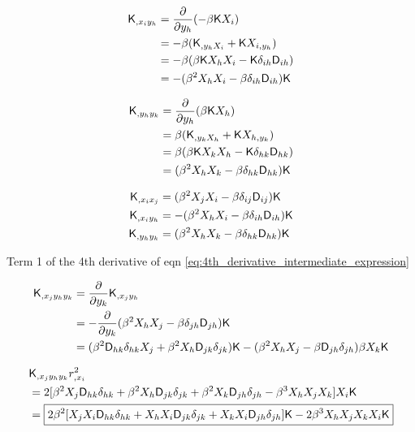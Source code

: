 \begin{align*}
\mathsf{K}_{,x_i y_h} &= \frac{\partial}{\partial y_h} (-\beta \mathsf{K} X_i)\\
&= -\beta(\mathsf{K}_{,y_h X_i} + \mathsf{K} X_{i, y_h})\\ 
&= -\beta(\beta \mathsf{K} X_h X_i - \mathsf{K} \delta_{ih} \mathsf{D}_{ih}) \\ 
&= -(\beta^2 X_h X_i - \beta \delta_{ih} \mathsf{D}_{ih})\mathsf{K} 
\end{align*}

\begin{align*}
\mathsf{K}_{,y_h y_k} &= \frac{\partial}{\partial y_h} (\beta \mathsf{K} X_h)\\
&= \beta(\mathsf{K}_{,y_k X_h} + \mathsf{K} X_{h, y_k})\\ 
&= \beta(\beta \mathsf{K} X_k X_h - \mathsf{K} \delta_{hk} \mathsf{D}_{hk}) \\ 
&= (\beta^2 X_h X_k - \beta \delta_{hk} \mathsf{D}_{hk})\mathsf{K} 
\end{align*}

\begin{align}
\mathsf{K}_{,x_i x_j} &= (\beta^2 X_j X_i - \beta \delta_{ij} \mathsf{D}_{ij})\mathsf{K}\\ 
\mathsf{K}_{,x_i y_h} &= -(\beta^2 X_h X_i - \beta \delta_{ih} \mathsf{D}_{ih})\mathsf{K}\\ 
\mathsf{K}_{,y_h y_k} &= (\beta^2 X_h X_k - \beta \delta_{hk} \mathsf{D}_{hk})\mathsf{K} 
\end{align}

Term 1 of the 4th derivative of eqn \ref{eq:4th_derivative_intermediate_expression}

\begin{align*}
\mathsf{K}_{,x_j y_h y_k}
&= \frac{\partial}{\partial y_k} \mathsf{K}_{,x_j y_h}\\ 
&= -\frac{\partial}{\partial y_k} (\beta^2 X_h X_j - \beta \delta_{jh} \mathsf{D}_{jh})\mathsf{K}\\
&= (\beta^2 \mathsf{D}_{hk} \delta_{hk} X_j + \beta^2 X_h \mathsf{D}_{jk}\delta_{jk})\mathsf{K} -
(\beta^2 X_h X_j - \beta \mathsf{D}_{jh} \delta_{jh})\beta X_k \mathsf{K}
\end{align*}

\begin{align*}
&\mathsf{K}_{,x_j y_h y_k} r_{,x_i}^2\\
&= 2[\beta^2 X_j \mathsf{D}_{hk} \delta_{hk} + \beta^2 X_h \mathsf{D}_{jk}\delta_{jk} +
\beta^2 X_k \mathsf{D}_{jh} \delta_{jh} - \beta^3 X_h X_j X_k] X_i \mathsf{K}\\ 
&=\boxed{2\beta^2[ 
X_j X_i \mathsf{D}_{hk} \delta_{hk} + 
X_h X_i \mathsf{D}_{jk} \delta_{jk} + 
X_k X_i \mathsf{D}_{jh} \delta_{jh}] \mathsf{K} 
- 2\beta^3 X_h X_j X_k X_i \mathsf{K}} 
\end{align*}

